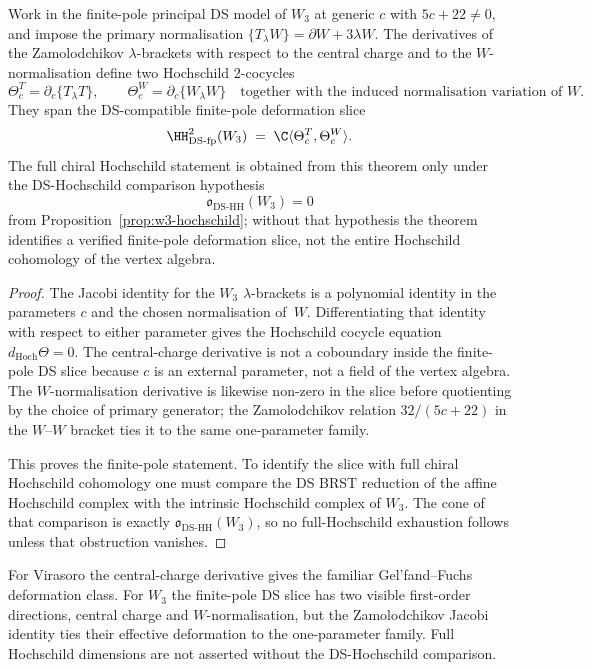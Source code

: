 \begin{theorem}
\label{thm:w3-bigraded-HH}
Work in the finite-pole principal DS model of $W_3$ at generic
$c$ with $5c+22\ne0$, and impose the primary normalisation
$\{T_\lambda W\}=\partial W+3\lambda W$. The derivatives of the
Zamolodchikov $\lambda$-brackets with respect to the central charge and
to the $W$-normalisation define two Hochschild $2$-cocycles
\[
 \Theta_c^T=\partial_c\{T_\lambda T\},\qquad
 \Theta_c^W=\partial_c\{W_\lambda W\}
 \quad\text{together with the induced normalisation variation of }W.
\]
They span the DS-compatible finite-pole deformation slice
\begin{equation}
\HH^2_{\mathrm{DS\text{-}fp}}(W_3)
\;=\;
\C\langle \Theta_c^T,\Theta_c^W\rangle .
\end{equation}
The full chiral Hochschild statement is obtained from this theorem
only under the DS-Hochschild comparison hypothesis
\[
 \mathfrak{o}_{\mathrm{DS\text{-}HH}}(W_3)=0
\]
from Proposition~\ref{prop:w3-hochschild}; without that hypothesis the
theorem identifies a verified finite-pole deformation slice, not the
entire Hochschild cohomology of the vertex algebra.
\end{theorem}

\begin{proof}
The Jacobi identity for the $W_3$ $\lambda$-brackets is a polynomial
identity in the parameters $c$ and the chosen normalisation of~$W$.
Differentiating that identity with respect to either parameter gives
the Hochschild cocycle equation
$d_{\mathrm{Hoch}}\Theta=0$. The central-charge derivative is not a
coboundary inside the finite-pole DS slice because $c$ is an external
parameter, not a field of the vertex algebra. The $W$-normalisation
derivative is likewise non-zero in the slice before quotienting by the
choice of primary generator; the Zamolodchikov relation
$32/(5c+22)$ in the $W$--$W$ bracket ties it to the same
one-parameter family.

This proves the finite-pole statement. To identify the slice with full
chiral Hochschild cohomology one must compare the DS BRST reduction of
the affine Hochschild complex with the intrinsic Hochschild complex of
$W_3$. The cone of that comparison is exactly
$\mathfrak{o}_{\mathrm{DS\text{-}HH}}(W_3)$, so no full-Hochschild
exhaustion follows unless that obstruction vanishes.
\end{proof}

\begin{remark}
\label{rem:w3-vs-vir-HH}
For Virasoro the central-charge derivative gives the familiar
Gel'fand--Fuchs deformation class. For $W_3$ the finite-pole DS slice
has two visible first-order directions, central charge and
$W$-normalisation, but the Zamolodchikov Jacobi identity ties their
effective deformation to the one-parameter family. Full Hochschild
dimensions are not asserted without the DS-Hochschild comparison.
\end{remark}


